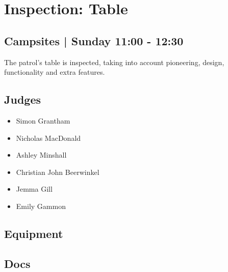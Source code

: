 \documentclass[10pt]{article}
\begin{document}
		\begin{minipage}{\linewidth}
		\setcounter{section}{40}
	\section{Inspection: Table }
	\subsection*{Campsites | Sunday 11:00 - 12:30}

	The patrol's table is inspected, taking into account pioneering, design, functionality and extra features.

	\begin{multicols}{2}
	\subsection*{\faUsers \: Judges}
	\begin{itemize}
			\item Simon Grantham
			\item Nicholas MacDonald
			\item Ashley Minshall
			\item Christian John Beerwinkel
			\item Jemma Gill
			\item Emily Gammon
		\end{itemize}
	\columnbreak
	\subsection*{\faWrench \: Equipment}
	        \vfill\null
        \subsection*{\faFile \: Docs}
     	\end{multicols}


	\vspace{1cm}
	\end{minipage}
\end{document}
